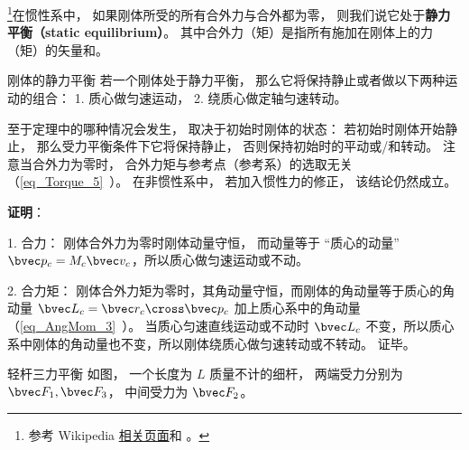 

\footnote{参考 Wikipedia \href{https://en.wikipedia.org/wiki/Mechanical_equilibrium}{相关页面}和 \cite{新力}。}在惯性系中， 如果刚体所受的所有合外力与合外都为零， 则我们说它处于\textbf{静力平衡（static equilibrium）}。 其中合外力（矩）是指所有施加在刚体上的力（矩）的矢量和。

\begin{theorem}{刚体的静力平衡}
若一个刚体处于静力平衡， 那么它将保持静止或者做以下两种运动的组合： 1. 质心做匀速运动， 2. 绕质心做定轴匀速转动。
\end{theorem}
至于定理中的哪种情况会发生， 取决于初始时刚体的状态： 若初始时刚体开始静止， 那么受力平衡条件下它将保持静止， 否则保持初始时的平动或/和转动。 注意当合外力为零时， 合外力矩与参考点（参考系）的选取无关（\autoref{eq_Torque_5}~）。 在非惯性系中， 若加入惯性力的修正， 该结论仍然成立。 

\textbf{证明}：

1. 合力： 刚体合外力为零时刚体动量守恒， 而动量等于 “质心的动量” 
$\bvec p_c = M_c \bvec v_c$，所以质心做匀速运动或不动。

2. 合力矩： 刚体合外力矩为零时，其角动量守恒，而刚体的角动量等于质心的角动量 $\bvec L_c =\bvec r_c\cross \bvec p_c$ 加上质心系中的角动量（\autoref{eq_AngMom_3}~）。 当质心匀速直线运动或不动时 $\bvec L_c$ 不变，所以质心系中刚体的角动量也不变，所以刚体绕质心做匀速转动或不转动。 证毕。

\begin{example}{轻杆三力平衡}
如图， 一个长度为 $L$ 质量不计的细杆， 两端受力分别为 $\bvec F_1, \bvec F_3$， 中间受力为 $\bvec F_2$。
\end{example}


